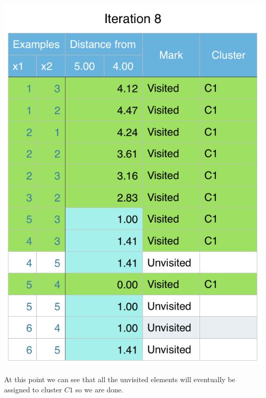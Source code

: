 \documentclass[11pt]{article}
\begin{document}
\begin{center}
\includegraphics[scale=0.57]{dbscan-iter8.png}
\end{center}

At this point we can see that all the unvisited elements will eventually be assigned to cluster $C1$ so we are done.
\end{document}
